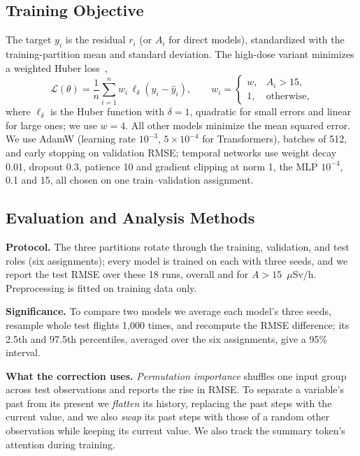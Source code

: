 \documentclass[10pt,twocolumn,letterpaper]{article}
\begin{document}
\subsection{Training Objective}
The target $y_i$ is the residual $r_i$ (or $A_i$ for direct models),
standardized with the training-partition mean and standard deviation. The
high-dose variant minimizes a weighted Huber loss~\cite{huber1964},
\begin{equation}
\mathcal{L}(\theta) = \frac{1}{n}\sum_{i=1}^{n} w_i\,
\ell_\delta\!\left(y_i - \hat{y}_i\right), \qquad
w_i = \begin{cases} w, & A_i > 15,\\ 1, & \text{otherwise,}\end{cases}
\label{eq:huber}
\end{equation}
where $\ell_\delta$ is the Huber function with $\delta=1$, quadratic for
small errors and linear for large ones; we use $w=4$. All other models
minimize the mean squared error. We use AdamW (learning rate $10^{-3}$,
$5\times10^{-4}$ for Transformers), batches of 512, and early stopping on
validation RMSE; temporal networks use weight decay 0.01, dropout 0.3,
patience 10 and gradient clipping at norm 1, the MLP $10^{-4}$, 0.1 and
15, all chosen on one train--validation assignment.

\subsection{Evaluation and Analysis Methods}
\label{sec:protocol}
\textbf{Protocol.} The three partitions rotate through the training,
validation, and test roles (six assignments); every model is trained on each
with three seeds, and we report the test RMSE over these 18 runs, overall and
for $A>15$~$\mu$Sv/h. Preprocessing is fitted on training data only.

\textbf{Significance.} To compare two models we average each model's three
seeds, resample whole test flights 1,000 times, and recompute the RMSE
difference; its 2.5th and 97.5th percentiles, averaged over the six
assignments, give a 95\% interval.

\textbf{What the correction uses.} \emph{Permutation importance} shuffles
one input group across test observations and reports the rise in RMSE.
To separate a variable's past from its present we \emph{flatten} its history,
replacing the past steps with the current value, and we also \emph{swap} its
past steps with those of a random other observation while keeping its
current value. We also track the summary token's attention during training.
\end{document}
